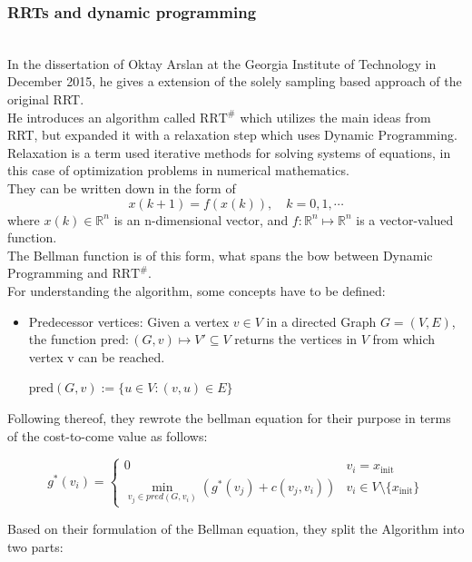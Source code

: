 \documentclass[conference]{IEEEtran}
\begin{document}
\subsubsection{RRTs and dynamic programming}
\quad \\
In the dissertation of Oktay Arslan at the Georgia Institute of Technology in December 2015, he gives a extension of the solely sampling based approach of the original RRT.\\
He introduces an algorithm called $\text{RRT}^\#$ which utilizes the main ideas from RRT, but expanded it with a relaxation step which uses Dynamic Programming.\\
Relaxation is a term used iterative methods for solving systems of equations, in this case of optimization problems in numerical mathematics.\\
They can be written down in the form of
\begin{equation}
x(k+1) = f(x(k)), \quad k = 0,1,\cdots
\end{equation}
where $x(k) \in \mathbb{R}^n$ is an n-dimensional vector, and $f : \mathbb{R}^n \mapsto \mathbb{R}^n$ is a vector-valued function.\\
The Bellman function is of this form, what spans the bow between Dynamic Programming and $\text{RRT}^\#$.\\
For understanding the algorithm, some concepts have to be defined:
\begin{itemize}
\item Predecessor vertices: Given a vertex $v \in V$ in a directed Graph $G = (V,E)$, the function $\text{pred} : (G,v) \mapsto V' \subseteq V$ returns the vertices in $V$ from which vertex v can be reached.
\begin{center}
$\text{pred}(G,v) := \{u \in V: (v,u) \in E\}$
\end{center}
\end{itemize}
Following thereof, they rewrote the bellman equation for their purpose in terms of the cost-to-come value as follows:
\begin{small}
\begin{equation}
g^*(v_i) = 
\begin{cases}
0 & v_i = x_\text{init}\\
\min_{v_j \in pred(G,v_i)} (g^*(v_j) + c(v_j,v_i)) & v_i \in V \setminus \{x_\text{init}\}
\end{cases}
\end{equation}
\end{small}
Based on their formulation of the Bellman equation, they split the Algorithm into two parts:\\
\end{document}
